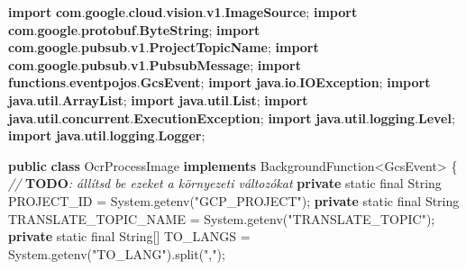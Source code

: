 \documentclass[
]{article}
\newenvironment{Shaded}{}{}
\newcommand{\AlertTok}[1]{\textcolor[rgb]{1.00,0.00,0.00}{\textbf{#1}}}
\newcommand{\BuiltInTok}[1]{\textcolor[rgb]{0.00,0.50,0.00}{#1}}
\newcommand{\CommentTok}[1]{\textcolor[rgb]{0.38,0.63,0.69}{\textit{#1}}}
\newcommand{\DataTypeTok}[1]{\textcolor[rgb]{0.56,0.13,0.00}{#1}}
\newcommand{\FunctionTok}[1]{\textcolor[rgb]{0.02,0.16,0.49}{#1}}
\newcommand{\ImportTok}[1]{\textcolor[rgb]{0.00,0.50,0.00}{\textbf{#1}}}
\newcommand{\KeywordTok}[1]{\textcolor[rgb]{0.00,0.44,0.13}{\textbf{#1}}}
\newcommand{\NormalTok}[1]{#1}
\newcommand{\OperatorTok}[1]{\textcolor[rgb]{0.40,0.40,0.40}{#1}}
\newcommand{\StringTok}[1]{\textcolor[rgb]{0.25,0.44,0.63}{#1}}
\begin{document}
\begin{Shaded}
\begin{Highlighting}[]
\KeywordTok{import} \ImportTok{com}\OperatorTok{.}\ImportTok{google}\OperatorTok{.}\ImportTok{cloud}\OperatorTok{.}\ImportTok{vision}\OperatorTok{.}\ImportTok{v1}\OperatorTok{.}\ImportTok{ImageSource}\OperatorTok{;}
\KeywordTok{import} \ImportTok{com}\OperatorTok{.}\ImportTok{google}\OperatorTok{.}\ImportTok{protobuf}\OperatorTok{.}\ImportTok{ByteString}\OperatorTok{;}
\KeywordTok{import} \ImportTok{com}\OperatorTok{.}\ImportTok{google}\OperatorTok{.}\ImportTok{pubsub}\OperatorTok{.}\ImportTok{v1}\OperatorTok{.}\ImportTok{ProjectTopicName}\OperatorTok{;}
\KeywordTok{import} \ImportTok{com}\OperatorTok{.}\ImportTok{google}\OperatorTok{.}\ImportTok{pubsub}\OperatorTok{.}\ImportTok{v1}\OperatorTok{.}\ImportTok{PubsubMessage}\OperatorTok{;}
\KeywordTok{import} \ImportTok{functions}\OperatorTok{.}\ImportTok{eventpojos}\OperatorTok{.}\ImportTok{GcsEvent}\OperatorTok{;}
\KeywordTok{import} \ImportTok{java}\OperatorTok{.}\ImportTok{io}\OperatorTok{.}\ImportTok{IOException}\OperatorTok{;}
\KeywordTok{import} \ImportTok{java}\OperatorTok{.}\ImportTok{util}\OperatorTok{.}\ImportTok{ArrayList}\OperatorTok{;}
\KeywordTok{import} \ImportTok{java}\OperatorTok{.}\ImportTok{util}\OperatorTok{.}\ImportTok{List}\OperatorTok{;}
\KeywordTok{import} \ImportTok{java}\OperatorTok{.}\ImportTok{util}\OperatorTok{.}\ImportTok{concurrent}\OperatorTok{.}\ImportTok{ExecutionException}\OperatorTok{;}
\KeywordTok{import} \ImportTok{java}\OperatorTok{.}\ImportTok{util}\OperatorTok{.}\ImportTok{logging}\OperatorTok{.}\ImportTok{Level}\OperatorTok{;}
\KeywordTok{import} \ImportTok{java}\OperatorTok{.}\ImportTok{util}\OperatorTok{.}\ImportTok{logging}\OperatorTok{.}\ImportTok{Logger}\OperatorTok{;}

\KeywordTok{public} \KeywordTok{class}\NormalTok{ OcrProcessImage }\KeywordTok{implements}\NormalTok{ BackgroundFunction}\OperatorTok{\textless{}}\NormalTok{GcsEvent}\OperatorTok{\textgreater{}} \OperatorTok{\{}
  \CommentTok{// }\AlertTok{TODO}\CommentTok{: állítsd be ezeket a környezeti változókat}
  \KeywordTok{private} \DataTypeTok{static} \DataTypeTok{final} \BuiltInTok{String}\NormalTok{ PROJECT\_ID }\OperatorTok{=} \BuiltInTok{System}\OperatorTok{.}\FunctionTok{getenv}\OperatorTok{(}\StringTok{"GCP\_PROJECT"}\OperatorTok{);}
  \KeywordTok{private} \DataTypeTok{static} \DataTypeTok{final} \BuiltInTok{String}\NormalTok{ TRANSLATE\_TOPIC\_NAME }\OperatorTok{=} \BuiltInTok{System}\OperatorTok{.}\FunctionTok{getenv}\OperatorTok{(}\StringTok{"TRANSLATE\_TOPIC"}\OperatorTok{);}
  \KeywordTok{private} \DataTypeTok{static} \DataTypeTok{final} \BuiltInTok{String}\OperatorTok{[]}\NormalTok{ TO\_LANGS }\OperatorTok{=} \BuiltInTok{System}\OperatorTok{.}\FunctionTok{getenv}\OperatorTok{(}\StringTok{"TO\_LANG"}\OperatorTok{).}\FunctionTok{split}\OperatorTok{(}\StringTok{","}\OperatorTok{);}


\end{Highlighting}
\end{Shaded}
\end{document}

